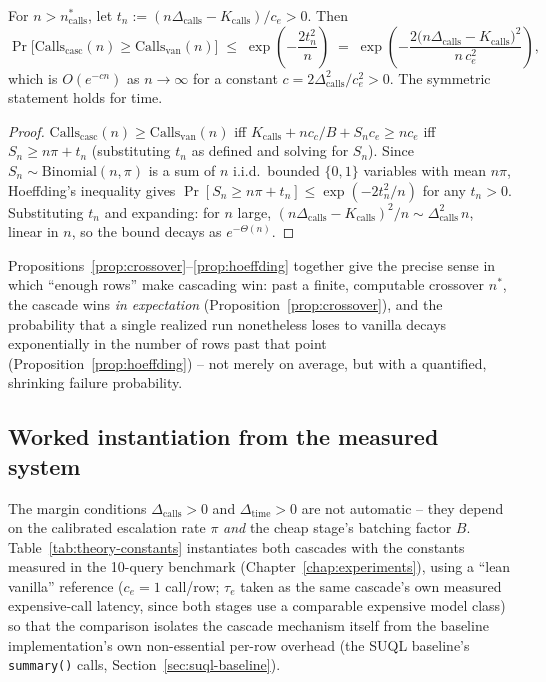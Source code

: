 \begin{proposition}
\label{prop:hoeffding}
For $n > n^\ast_{\mathrm{calls}}$, let
$t_n := (n\Delta_{\mathrm{calls}} - K_{\mathrm{calls}})/c_e > 0$. Then
\[
  \Pr\bigl[\mathrm{Calls}_{\mathrm{casc}}(n) \ge \mathrm{Calls}_{\mathrm{van}}(n)\bigr]
  \;\le\; \exp\!\left(-\frac{2t_n^2}{n}\right)
  \;=\; \exp\!\left(-\frac{2\bigl(n\Delta_{\mathrm{calls}}-K_{\mathrm{calls}}\bigr)^2}{n\,c_e^2}\right),
\]
which is $O(e^{-cn})$ as $n\to\infty$ for a constant
$c = 2\Delta_{\mathrm{calls}}^2/c_e^2 > 0$. The symmetric statement holds
for time.
\end{proposition}
\begin{proof}
$\mathrm{Calls}_{\mathrm{casc}}(n) \ge \mathrm{Calls}_{\mathrm{van}}(n)$
iff $K_{\mathrm{calls}} + n c_c/B + S_n c_e \ge n c_e$ iff
$S_n \ge n\pi + t_n$ (substituting $t_n$ as defined and solving for
$S_n$). Since $S_n\sim\mathrm{Binomial}(n,\pi)$ is a sum of $n$ i.i.d.\
bounded $\{0,1\}$ variables with mean $n\pi$, Hoeffding's inequality
gives $\Pr[S_n \ge n\pi + t_n] \le \exp(-2t_n^2/n)$ for any $t_n>0$.
Substituting $t_n$ and expanding: for $n$ large,
$(n\Delta_{\mathrm{calls}}-K_{\mathrm{calls}})^2/n \sim \Delta_{\mathrm{calls}}^2\, n$,
linear in $n$, so the bound decays as $e^{-\Theta(n)}$.
\end{proof}
Propositions~\ref{prop:crossover}--\ref{prop:hoeffding} together give the
precise sense in which ``enough rows'' make cascading win: past a finite,
computable crossover $n^\ast$, the cascade wins \emph{in expectation}
(Proposition~\ref{prop:crossover}), and the probability that a single
realized run nonetheless loses to vanilla decays exponentially in the
number of rows past that point (Proposition~\ref{prop:hoeffding}) -- not
merely on average, but with a quantified, shrinking failure probability.

\subsection{Worked instantiation from the measured system}
\label{sec:worked-instantiation}
The margin conditions $\Delta_{\mathrm{calls}}>0$ and
$\Delta_{\mathrm{time}}>0$ are not automatic -- they depend on the
calibrated escalation rate $\pi$ \emph{and} the cheap stage's batching
factor $B$. Table~\ref{tab:theory-constants} instantiates both cascades
with the constants measured in the 10-query benchmark
(Chapter~\ref{chap:experiments}), using a ``lean vanilla'' reference
($c_e=1$ call/row; $\tau_e$ taken as the same cascade's own measured
expensive-call latency, since both stages use a comparable expensive
model class) so that the comparison isolates the cascade mechanism
itself from the baseline implementation's own non-essential per-row
overhead (\eg the SUQL baseline's \texttt{summary()} calls,
Section~\ref{sec:suql-baseline}).


